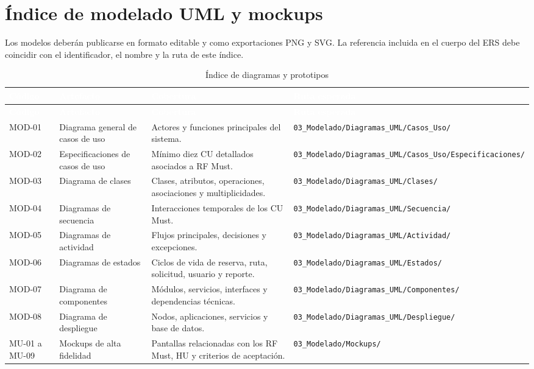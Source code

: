 \documentclass[12pt,a4paper]{article}
\begin{document}
\section{Índice de modelado UML y mockups}
\label{ap:modelado-mockups}

Los modelos deberán publicarse en formato editable y como exportaciones PNG y SVG. La referencia incluida en el cuerpo del ERS debe coincidir con el identificador, el nombre y la ruta de este índice.

\begin{longtable}{L{1.55cm} L{3.25cm} L{4.00cm} L{4.35cm}}
\caption{Índice de diagramas y prototipos}\label{tab:indice-modelos-anexo}\\
\textcolor{white}{\textbf{Código}} &
\textcolor{white}{\textbf{Artefacto}} &
\textcolor{white}{\textbf{Cobertura}} &
\textcolor{white}{\textbf{Ruta esperada}}\\
\endfirsthead
{}
\textcolor{white}{\textbf{Código}} &
\textcolor{white}{\textbf{Artefacto}} &
\textcolor{white}{\textbf{Cobertura}} &
\textcolor{white}{\textbf{Ruta esperada}}\\
\endhead
MOD-01 & Diagrama general de casos de uso & Actores y funciones principales del sistema. & \nolinkurl{03_Modelado/Diagramas_UML/Casos_Uso/}\\
MOD-02 & Especificaciones de casos de uso & Mínimo diez CU detallados asociados a RF Must. & \nolinkurl{03_Modelado/Diagramas_UML/Casos_Uso/Especificaciones/}\\
MOD-03 & Diagrama de clases & Clases, atributos, operaciones, asociaciones y multiplicidades. & \nolinkurl{03_Modelado/Diagramas_UML/Clases/}\\
MOD-04 & Diagramas de secuencia & Interacciones temporales de los CU Must. & \nolinkurl{03_Modelado/Diagramas_UML/Secuencia/}\\
MOD-05 & Diagramas de actividad & Flujos principales, decisiones y excepciones. & \nolinkurl{03_Modelado/Diagramas_UML/Actividad/}\\
MOD-06 & Diagramas de estados & Ciclos de vida de reserva, ruta, solicitud, usuario y reporte. & \nolinkurl{03_Modelado/Diagramas_UML/Estados/}\\
MOD-07 & Diagrama de componentes & Módulos, servicios, interfaces y dependencias técnicas. & \nolinkurl{03_Modelado/Diagramas_UML/Componentes/}\\
MOD-08 & Diagrama de despliegue & Nodos, aplicaciones, servicios y base de datos. & \nolinkurl{03_Modelado/Diagramas_UML/Despliegue/}\\
MU-01 a MU-09 & Mockups de alta fidelidad & Pantallas relacionadas con los RF Must, HU y criterios de aceptación. & \nolinkurl{03_Modelado/Mockups/}\\
\end{longtable}
\end{document}
